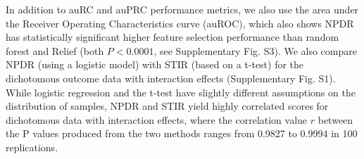 \documentclass{bioinfo}
\begin{document}

In addition to auRC and auPRC performance metrics, we also use the area under the Receiver Operating Characteristics curve (auROC), which also shows NPDR has statistically significant higher feature selection performance than random forest and Relief (both $P < 0.0001$, see Supplementary Fig. S3).
We also compare NPDR (using a logistic model) with STIR (based on a t-test) for the dichotomous outcome data with interaction effects (Supplementary Fig. S1).
While logistic regression and the t-test have slightly different assumptions on the distribution of samples, NPDR and STIR yield highly correlated scores for dichotomous data with interaction effects, where the correlation value $r$ between the P values produced from the two methods ranges from 0.9827 to 0.9994 in 100 replications.
\end{document}
